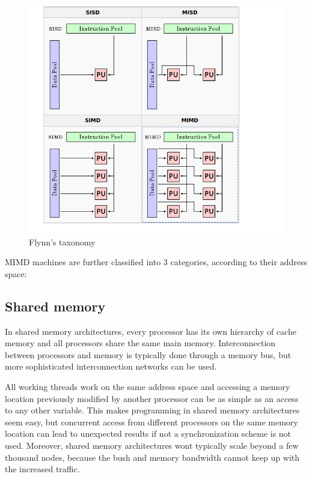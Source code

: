 \begin{figure}
 \centering
  \includegraphics[scale=0.4]{flynsTaxonomy.png}
\caption{Flynn's taxonomy}
\label{Flynn's taxonomy}
\end{figure}

MIMD machines are further classified into 3 categories, according to their address space:

\subsection{Shared memory}

In shared memory architectures, every processor has its own hierarchy of cache memory and all processors share the same main memory. Interconnection between processors and memory is typically done through a memory bus, but more sophisticated interconnection networks can be used. %

 All working threads work on the same address space and accessing a memory location previously modified by another processor can be as simple as an access to any other variable. This makes programming in shared memory architectures seem easy, but concurrent access from different processors on the same memory location can lead to unexpected results if not a synchronization scheme is not used. Moreover, shared memory architectures wont typically scale beyond a few thousand nodes, because the bush and memory bandwidth cannot keep up with the increased traffic.

